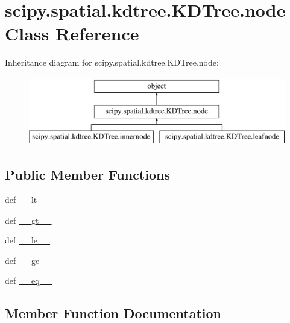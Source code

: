 \hypertarget{classscipy_1_1spatial_1_1kdtree_1_1KDTree_1_1node}{}\section{scipy.\+spatial.\+kdtree.\+K\+D\+Tree.\+node Class Reference}
\label{classscipy_1_1spatial_1_1kdtree_1_1KDTree_1_1node}
Inheritance diagram for scipy.\+spatial.\+kdtree.\+K\+D\+Tree.\+node\+:\begin{figure}[H]
\begin{center}
\leavevmode
\includegraphics[height=3.000000cm]{classscipy_1_1spatial_1_1kdtree_1_1KDTree_1_1node}
\end{center}
\end{figure}
\subsection*{Public Member Functions}
\begin{DoxyCompactItemize}
\item 
def \hyperlink{classscipy_1_1spatial_1_1kdtree_1_1KDTree_1_1node_adef377b5ff3471cbfaf88a4bcb3c9d15}{\+\_\+\+\_\+lt\+\_\+\+\_\+}
\item 
def \hyperlink{classscipy_1_1spatial_1_1kdtree_1_1KDTree_1_1node_a8c96318911ea33430959d416760ca89e}{\+\_\+\+\_\+gt\+\_\+\+\_\+}
\item 
def \hyperlink{classscipy_1_1spatial_1_1kdtree_1_1KDTree_1_1node_affc026f503a27ec3f4efdb0254b5e09b}{\+\_\+\+\_\+le\+\_\+\+\_\+}
\item 
def \hyperlink{classscipy_1_1spatial_1_1kdtree_1_1KDTree_1_1node_a57d99fb86ac1c0efaca512a1d8f41cdc}{\+\_\+\+\_\+ge\+\_\+\+\_\+}
\item 
def \hyperlink{classscipy_1_1spatial_1_1kdtree_1_1KDTree_1_1node_afd98d41254d0024087b751a8f95ecbbb}{\+\_\+\+\_\+eq\+\_\+\+\_\+}
\end{DoxyCompactItemize}


\subsection{Member Function Documentation}
\hypertarget{classscipy_1_1spatial_1_1kdtree_1_1KDTree_1_1node_afd98d41254d0024087b751a8f95ecbbb}{}
